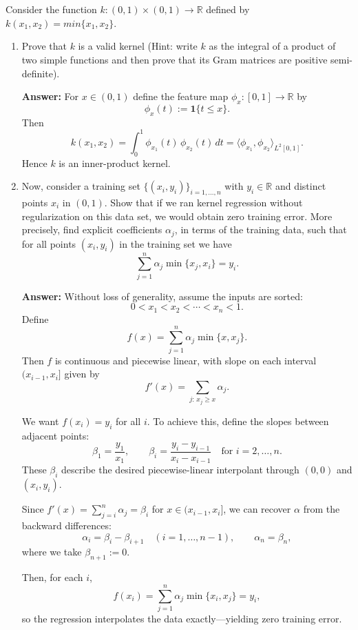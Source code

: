 \documentclass[a4paper]{article}
\begin{document}
\section{}
Consider the function $k : (0, 1) \times (0, 1) \rightarrow \mathbb{R}$ defined by $k(x_1 , x_2 ) = min\{x_1 , x_2\}$.
\begin{enumerate}
    \item Prove that $k$ is a valid kernel (Hint: write $k$ as the integral of a product of two simple functions and then prove that its Gram matrices are positive semi-definite).

\textbf{Answer:}
For $x\in(0,1)$ define the feature map $\phi_x:[0,1]\to\mathbb{R}$ by
\[
\phi_x(t):=\mathbf{1}\{t\le x\}.
\]
Then
\[
k(x_1,x_2)=\int_0^1 \phi_{x_1}(t)\,\phi_{x_2}(t)\,dt
=\langle \phi_{x_1},\phi_{x_2}\rangle_{L^2[0,1]}.
\]
Hence $k$ is an inner-product kernel.
    \item Now, consider a training set $\{(x_i , y_i )\}_{i=1,\dots,n}$ with $y_i \in \mathbb{R}$ and distinct points $x_i$ in $(0, 1)$.
        Show that if we ran kernel regression without regularization on this data set, we would obtain zero training error.
More precisely, find explicit coefficients $\alpha_j$, in terms of the training data, such that for all points $(x_i , y_i)$ in the training set we have
$$\sum_{j=1}^n \alpha_j \min\{x_j , x_i \} = y_i .$$

\textbf{Answer:}
Without loss of generality, assume the inputs are sorted:
\[
0 < x_1 < x_2 < \cdots < x_n < 1.
\]
Define
\[
f(x) = \sum_{j=1}^n \alpha_j \min\{x, x_j\}.
\]
Then $f$ is continuous and piecewise linear, with slope on each interval $(x_{i-1}, x_i]$ given by
\[
f'(x) = \sum_{j:\, x_j \ge x} \alpha_j.
\]

We want $f(x_i) = y_i$ for all $i$.  
To achieve this, define the slopes between adjacent points:
\[
\beta_1 = \frac{y_1}{x_1}, \qquad 
\beta_i = \frac{y_i - y_{i-1}}{x_i - x_{i-1}} \quad \text{for } i = 2, \dots, n.
\]
These $\beta_i$ describe the desired piecewise-linear interpolant through $(0,0)$ and $(x_i, y_i)$.

Since $f'(x) = \sum_{j=i}^n \alpha_j = \beta_i$ for $x \in (x_{i-1}, x_i]$,  
we can recover $\alpha$ from the backward differences:
\[
\alpha_i = \beta_i - \beta_{i+1} \quad (i = 1, \dots, n-1), 
\qquad \alpha_n = \beta_n,
\]
where we take $\beta_{n+1} := 0$.

Then, for each $i$,
\[
f(x_i) = \sum_{j=1}^n \alpha_j \min\{x_i, x_j\} = y_i,
\]
so the regression interpolates the data exactly—yielding zero training error.
\end{enumerate}
\end{document}
